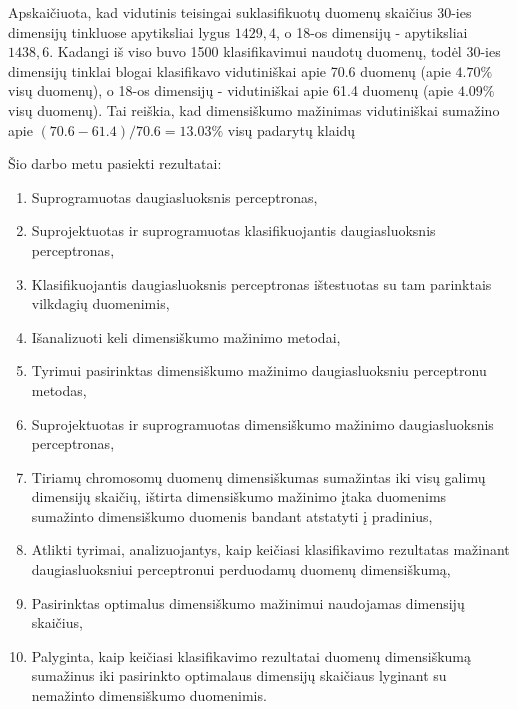 \documentclass{VUMIFPSbakalaurinis}
\begin{document}
Apskaičiuota, kad vidutinis teisingai suklasifikuotų duomenų skaičius 30-ies dimensijų tinkluose apytiksliai lygus $1429,4$, o 18-os dimensijų - apytiksliai $1438,6$.
Kadangi iš viso buvo 1500 klasifikavimui naudotų duomenų, todėl 30-ies dimensijų tinklai blogai klasifikavo vidutiniškai apie 70.6 duomenų (apie $4.70\%$ visų duomenų), o 18-os dimensijų - vidutiniškai apie 61.4 duomenų (apie $4.09\%$ visų duomenų).
Tai reiškia, kad dimensiškumo mažinimas vidutiniškai sumažino apie $(70.6 - 61.4) / 70.6 = 13.03\%$ visų padarytų klaidų



Šio darbo metu pasiekti rezultatai:
\begin{enumerate}
	\item Suprogramuotas daugiasluoksnis perceptronas,
	\item Suprojektuotas ir suprogramuotas klasifikuojantis daugiasluoksnis perceptronas,
	\item Klasifikuojantis daugiasluoksnis perceptronas ištestuotas su tam parinktais vilkdagių duomenimis,

	\item Išanalizuoti keli dimensiškumo mažinimo metodai,
	\item Tyrimui pasirinktas dimensiškumo mažinimo daugiasluoksniu perceptronu metodas,
	\item Suprojektuotas ir suprogramuotas dimensiškumo mažinimo daugiasluoksnis perceptronas,
	\item Tiriamų chromosomų duomenų dimensiškumas sumažintas iki visų galimų dimensijų skaičių, ištirta dimensiškumo mažinimo įtaka duomenims sumažinto dimensiškumo duomenis bandant atstatyti į pradinius,

	\item Atlikti tyrimai, analizuojantys, kaip keičiasi klasifikavimo rezultatas mažinant daugiasluoksniui perceptronui perduodamų duomenų dimensiškumą,
	\item Pasirinktas optimalus dimensiškumo mažinimui naudojamas dimensijų skaičius,
	\item Palyginta, kaip keičiasi klasifikavimo rezultatai duomenų dimensiškumą sumažinus iki pasirinkto optimalaus dimensijų skaičiaus lyginant su nemažinto dimensiškumo duomenimis.
\end{enumerate}
\end{document}

